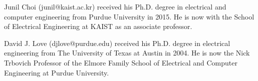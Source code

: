 \documentclass[lettersize,journal]{IEEEtran}
\begin{document}
\begin{IEEEbiographynophoto}{Junil Choi}
	(junil@kaist.ac.kr) received his Ph.D. degree in electrical and computer engineering from Purdue University in 2015. He is now with the School of Electrical Engineering at KAIST as an associate professor.
\end{IEEEbiographynophoto}

\begin{IEEEbiographynophoto}{David J. Love}
	(djlove@purdue.edu) received his Ph.D. degree in electrical engineering from The University of Texas at Austin in 2004. He is now the Nick Trbovich Professor of the Elmore Family School of Electrical and Computer Engineering at Purdue University.
\end{IEEEbiographynophoto}
\end{document}
